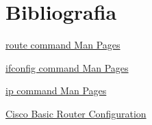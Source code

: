 \section{Bibliografia}

\href{https://man7.org/linux/man-pages/man8/route.8.html}{route command Man Pages}

\href{https://man7.org/linux/man-pages/man8/ifconfig.8.html}{ifconfig command Man Pages}

\href{https://linux.die.net/man/8/ip}{ip command Man Pages}

\href{https://www.cisco.com/c/en/us/td/docs/routers/access/1900/software/configuration/guide/Software_Configuration/routconf.html}{Cisco Basic Router Configuration}